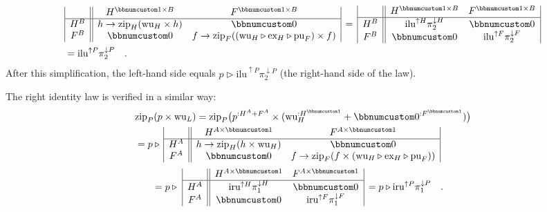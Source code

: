 \begin{align*}
 & \begin{array}{|c||cc|}
 & H^{\bbnum 1\times B} & F^{\bbnum 1\times B}\\
\hline H^{B} & h\rightarrow\text{zip}_{H}(\text{wu}_{H}\times h) & \bbnum 0\\
F^{B} & \bbnum 0 & f\rightarrow\text{zip}_{F}((\text{wu}_{H}\triangleright\text{ex}_{H}\triangleright\text{pu}_{F})\times f)
\end{array}\,=\,\begin{array}{|c||cc|}
 & H^{\bbnum 1\times B} & F^{\bbnum 1\times B}\\
\hline H^{B} & \text{ilu}^{\uparrow H}\pi_{2}^{\downarrow H} & \bbnum 0\\
F^{B} & \bbnum 0 & \text{ilu}^{\uparrow F}\pi_{2}^{\downarrow F}
\end{array}\\
 & =\text{ilu}^{\uparrow P}\pi_{2}^{\downarrow P}\quad.
\end{align*}
After this simplification, the left-hand side equals $p\triangleright\text{ilu}^{\uparrow P}\pi_{2}^{\downarrow P}$
(the right-hand side of the law).

The right identity law is verified in a similar way:
\begin{align*}
 & \text{zip}_{P}(p\times\text{wu}_{L})=\text{zip}_{P}\big(p^{:H^{A}+F^{A}}\times(\text{wu}_{H}^{:H^{\bbnum 1}}+\bbnum 0^{:F^{\bbnum 1}})\big)\\
 & =p\triangleright\,\begin{array}{|c||cc|}
 & H^{A\times\bbnum 1} & F^{A\times\bbnum 1}\\
\hline H^{A} & h\rightarrow\text{zip}_{H}(h\times\text{wu}_{H}) & \bbnum 0\\
F^{A} & \bbnum 0 & f\rightarrow\text{zip}_{F}(f\times(\text{wu}_{H}\triangleright\text{ex}_{H}\triangleright\text{pu}_{F}))
\end{array}
\end{align*}
\begin{align*}
 & =p\triangleright\,\,\begin{array}{|c||cc|}
 & H^{A\times\bbnum 1} & F^{A\times\bbnum 1}\\
\hline H^{A} & \text{iru}^{\uparrow H}\pi_{1}^{\downarrow H} & \bbnum 0\\
F^{A} & \bbnum 0 & \text{iru}^{\uparrow F}\pi_{1}^{\downarrow F}
\end{array}\,=p\triangleright\text{iru}^{\uparrow P}\pi_{1}^{\downarrow P}\quad.
\end{align*}

